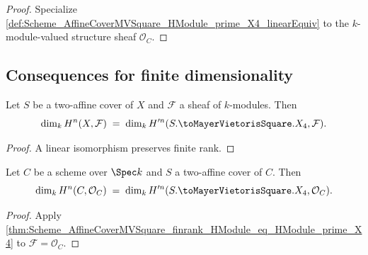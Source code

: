 \begin{proof}


\leanok
  Specialize \cref{def:Scheme_AffineCoverMVSquare_HModule_prime_X4_linearEquiv} to the \(k\)-module-valued structure sheaf \(\mathcal O_C\).
\end{proof}

\subsection{Consequences for finite dimensionality}

\begin{theorem}\leanok
  \label{thm:Scheme_AffineCoverMVSquare_finrank_HModule_eq_HModule_prime_X4}

  Let \(S\) be a two-affine cover of \(X\) and \(\mathcal F\) a sheaf of \(k\)-modules. Then
  \[
    \dim_k H^{n}(X, \mathcal F) \;=\; \dim_k H^{\prime n}(S.\toMayerVietorisSquare.X_4, \mathcal F).
  \]
\end{theorem}

\begin{proof}


\leanok
  A linear isomorphism preserves finite rank.
\end{proof}

\begin{theorem}\leanok
  \label{thm:Scheme_AffineCoverMVSquare_finrank_HModule_eq_HModule_prime_X4_curve}

  Let \(C\) be a scheme over \(\Spec k\) and \(S\) a two-affine cover of \(C\). Then
  \[
    \dim_k H^{n}(C, \mathcal O_C) \;=\; \dim_k H^{\prime n}(S.\toMayerVietorisSquare.X_4, \mathcal O_C).
  \]
\end{theorem}

\begin{proof}


\leanok
  Apply \cref{thm:Scheme_AffineCoverMVSquare_finrank_HModule_eq_HModule_prime_X4} to \(\mathcal F=\mathcal O_C\).
\end{proof}

